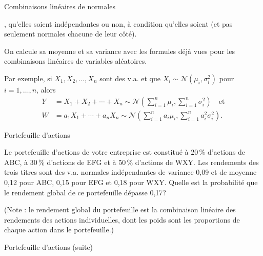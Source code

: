 \documentclass{BeamerTemplate}
\newcommand{\cibleReponse}{}
\newcommand{\lienreponse}[1]{\gdef\cibleReponse{#1}}
\begin{document}
\begin{frame}[t]{Combinaisons linéaires de normales}

,
qu'elles soient indépendantes ou non, à condition qu'elles soient 
(et pas seulement normales chacune de leur côté).

\smallskip
On calcule sa moyenne et sa variance avec les formules déjà vues pour les combinaisons linéaires de
variables aléatoires.

\smallskip
Par exemple, si $X_1,X_2,\ldots,X_n$ sont des v.a.  et que $X_i\sim \mathcal{N}(\mu_i,\sigma^2_i)$
pour $i=1,\ldots,n$, alors
\begin{align*}
Y&=X_1+X_2+\cdots+X_n \sim \mathcal{N}\left( \sum_{i=1}^n \mu_i,\sum_{i=1}^n \sigma^2_i \right) \quad\text{et}\\[4pt]
W&=a_1X_1+\cdots+a_nX_n \sim \mathcal{N}\left( \sum_{i=1}^n a_i \mu_i,\sum_{i=1}^n a_i^2 \sigma^2_i \right).
\end{align*}

\end{frame}


\begin{frame}[t,label=exportefeuille]{Portefeuille d'actions}

{\small
Le portefeuille d'actions de votre entreprise est constitué à 20\,\% d'actions de ABC, à 30\,\%
d'actions de EFG et à 50\,\% d'actions de WXY. Les rendements des trois titres sont des v.a.
normales indépendantes de variance 0,09 et de moyenne 0,12 pour ABC, 0,15 pour EFG et 0,18 pour WXY.
Quelle est la probabilité que le rendement global de ce portefeuille dépasse 0,17?

\smallskip
(Note : le rendement global du portefeuille est la combinaison linéaire des rendements des actions
individuelles, dont les poids sont les proportions de chaque action dans le portefeuille.)
}
\lienreponse{rep-ex2}
\end{frame}


\begin{frame}[t]{Portefeuille d'actions (suite)}

\lienreponse{rep-ex2}
\end{frame}
\end{document}
